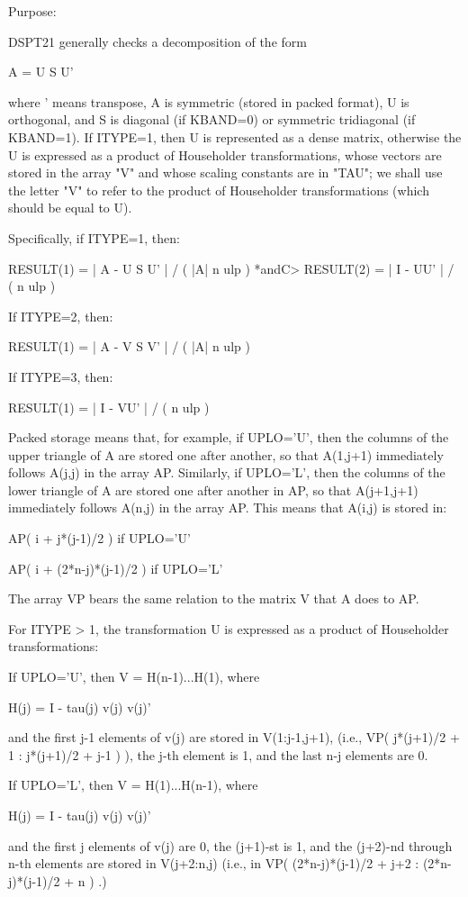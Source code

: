 \begin{DoxyParagraph}{Purpose\+: }
\begin{DoxyVerb} DSPT21  generally checks a decomposition of the form

         A = U S U'

 where ' means transpose, A is symmetric (stored in packed format), U
 is orthogonal, and S is diagonal (if KBAND=0) or symmetric
 tridiagonal (if KBAND=1).  If ITYPE=1, then U is represented as a
 dense matrix, otherwise the U is expressed as a product of
 Householder transformations, whose vectors are stored in the array
 "V" and whose scaling constants are in "TAU"; we shall use the
 letter "V" to refer to the product of Householder transformations
 (which should be equal to U).

 Specifically, if ITYPE=1, then:

         RESULT(1) = | A - U S U' | / ( |A| n ulp ) *andC>         RESULT(2) = | I - UU' | / ( n ulp )

 If ITYPE=2, then:

         RESULT(1) = | A - V S V' | / ( |A| n ulp )

 If ITYPE=3, then:

         RESULT(1) = | I - VU' | / ( n ulp )

 Packed storage means that, for example, if UPLO='U', then the columns
 of the upper triangle of A are stored one after another, so that
 A(1,j+1) immediately follows A(j,j) in the array AP.  Similarly, if
 UPLO='L', then the columns of the lower triangle of A are stored one
 after another in AP, so that A(j+1,j+1) immediately follows A(n,j)
 in the array AP.  This means that A(i,j) is stored in:

    AP( i + j*(j-1)/2 )                 if UPLO='U'

    AP( i + (2*n-j)*(j-1)/2 )           if UPLO='L'

 The array VP bears the same relation to the matrix V that A does to
 AP.

 For ITYPE > 1, the transformation U is expressed as a product
 of Householder transformations:

    If UPLO='U', then  V = H(n-1)...H(1),  where

        H(j) = I  -  tau(j) v(j) v(j)'

    and the first j-1 elements of v(j) are stored in V(1:j-1,j+1),
    (i.e., VP( j*(j+1)/2 + 1 : j*(j+1)/2 + j-1 ) ),
    the j-th element is 1, and the last n-j elements are 0.

    If UPLO='L', then  V = H(1)...H(n-1),  where

        H(j) = I  -  tau(j) v(j) v(j)'

    and the first j elements of v(j) are 0, the (j+1)-st is 1, and the
    (j+2)-nd through n-th elements are stored in V(j+2:n,j) (i.e.,
    in VP( (2*n-j)*(j-1)/2 + j+2 : (2*n-j)*(j-1)/2 + n ) .)\end{DoxyVerb}
 
\end{DoxyParagraph}

